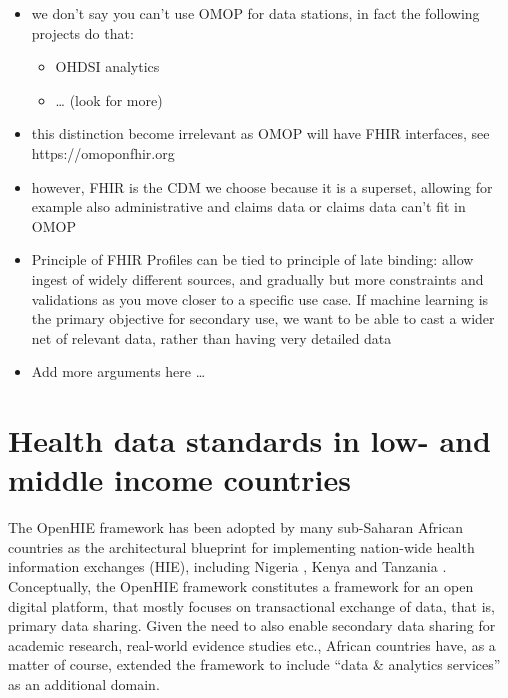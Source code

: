 \documentclass[
  authoryear]{elsarticle}
\providecommand{\tightlist}{%
  \setlength{\itemsep}{0pt}\setlength{\parskip}{0pt}}\usepackage{longtable,booktabs,array}
\begin{document}
\begin{itemize}
\item
  we don't say you can't use OMOP for data stations, in fact the
  following projects do that:

  \begin{itemize}
  \tightlist
  \item
    OHDSI analytics \citep{khalid2021standardized}
  \item
    \ldots{} (look for more)
  \end{itemize}
\item
  this distinction become irrelevant as OMOP will have FHIR interfaces,
  see https://omoponfhir.org
\item
  however, FHIR is the CDM we choose because it is a superset, allowing
  for example also administrative and claims data or claims data can't
  fit in OMOP
\item
  Principle of FHIR Profiles can be tied to principle of late binding:
  allow ingest of widely different sources, and gradually but more
  constraints and validations as you move closer to a specific use case.
  If machine learning is the primary objective for secondary use, we
  want to be able to cast a wider net of relevant data, rather than
  having very detailed data
\item
  Add more arguments here \ldots{}
\end{itemize}

\section{Health data standards in low- and middle income
countries}\label{health-data-standards-in-low--and-middle-income-countries}

The OpenHIE framework \citep{openhie} has been adopted by many
sub-Saharan African countries \citep{mamuye2022health} as the
architectural blueprint for implementing nation-wide health information
exchanges (HIE), including Nigeria \citep{dalhatu2023paper}, Kenya
\citep{thaiya2021adoption} and Tanzania \citep{nsaghurwe2021one}.
Conceptually, the OpenHIE framework constitutes a framework for an open
digital platform, that mostly focuses on transactional exchange of data,
that is, primary data sharing. Given the need to also enable secondary
data sharing for academic research, real-world evidence studies etc.,
African countries have, as a matter of course, extended the framework to
include ``data \& analytics services'' as an additional domain.
\end{document}
